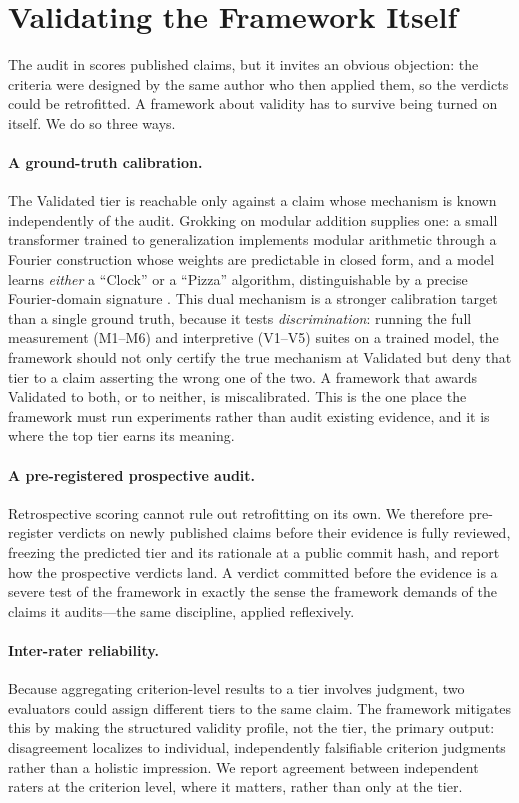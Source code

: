 \documentclass{article}
\begin{document}
\section{Validating the Framework Itself}
\label{sec:self-validation}

The audit in  scores published claims, but it invites an obvious objection: the criteria were designed by the same author who then applied them, so the verdicts could be retrofitted. A framework about validity has to survive being turned on itself. We do so three ways.

\paragraph{A ground-truth calibration.} The Validated tier is reachable only against a claim whose mechanism is known independently of the audit. Grokking on modular addition supplies one: a small transformer trained to generalization implements modular arithmetic through a Fourier construction whose weights are predictable in closed form, and a model learns \emph{either} a ``Clock'' or a ``Pizza'' algorithm, distinguishable by a precise Fourier-domain signature \citep{nanda2023progress}. This dual mechanism is a stronger calibration target than a single ground truth, because it tests \emph{discrimination}: running the full measurement (M1--M6) and interpretive (V1--V5) suites on a trained model, the framework should not only certify the true mechanism at Validated but deny that tier to a claim asserting the wrong one of the two. A framework that awards Validated to both, or to neither, is miscalibrated. This is the one place the framework must run experiments rather than audit existing evidence, and it is where the top tier earns its meaning.

\paragraph{A pre-registered prospective audit.} Retrospective scoring cannot rule out retrofitting on its own. We therefore pre-register verdicts on newly published claims before their evidence is fully reviewed, freezing the predicted tier and its rationale at a public commit hash, and report how the prospective verdicts land. A verdict committed before the evidence is a severe test of the framework in exactly the sense the framework demands of the claims it audits---the same discipline, applied reflexively.

\paragraph{Inter-rater reliability.} Because aggregating criterion-level results to a tier involves judgment, two evaluators could assign different tiers to the same claim. The framework mitigates this by making the structured validity profile, not the tier, the primary output: disagreement localizes to individual, independently falsifiable criterion judgments rather than a holistic impression. We report agreement between independent raters at the criterion level, where it matters, rather than only at the tier.
\end{document}
